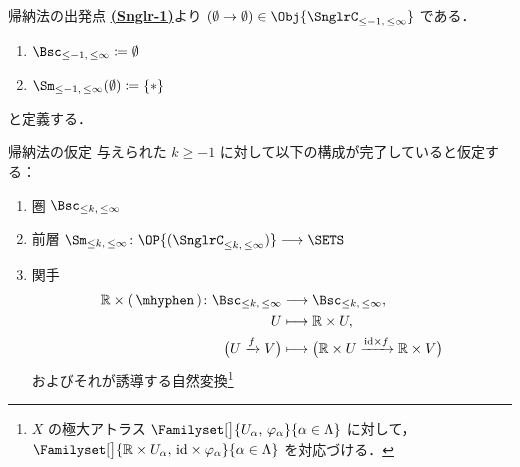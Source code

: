 \documentclass[TQFT_main]{subfiles}
\begin{document}
\begin{mydef}[label=def:induction-init]{帰納法の出発点}
    \hyperref[def:Snglr-C0]{\textsf{\textbf{(Snglr-1)}}}より $(\emptyset \to \emptyset) \in \Obj{\SnglrC_{\le -1,\, \le \infty}}$ である．
    \begin{enumerate}
        \item $\Bsc_{\le -1,\, \le \infty} \coloneqq \emptyset$
        \item $\Sm_{\le -1,\, \le \infty}(\emptyset) \coloneqq \{*\}$
    \end{enumerate}
    と定義する．
\end{mydef}

\begin{myassump}[label=assump:induction-Bsc-Sm]{帰納法の仮定}
    与えられた $k \ge -1$ に対して以下の構成が完了していると仮定する：
    \begin{enumerate}
        \item 圏 $\Bsc_{\le k,\, \le \infty}$
        \item 前層 $\Sm_{\le k,\, \le \infty} \colon \OP{(\SnglrC_{\le k,\, \le \infty})} \lto \SETS$
        \item 関手
        \begin{align}
            \mathbb{R} \times (\, \mhyphen \,) \colon \Bsc_{\le k,\, \le \infty} &\lto \Bsc_{\le k,\, \le \infty}, \\
            U &\lmto \mathbb{R} \times U, \\
            \bigl( U \xrightarrow{f} V \bigr) &\lmto \bigl( \mathbb{R} \times U \xrightarrow{\mathrm{id} \times f} \mathbb{R} \times V \bigr) 
        \end{align}
        およびそれが誘導する自然変換\footnote{$X$ の極大アトラス $\Familyset[\big]{U_\alpha,\, \varphi_\alpha}{\alpha \in \Lambda}$ に対して，$\Familyset[\big]{\mathbb{R} \times U_\alpha,\, \mathrm{id} \times \varphi_\alpha}{\alpha \in \Lambda}$ を対応づける．}
        \begin{center}
        \end{center}
    \end{enumerate}
\end{myassump}
\end{document}
